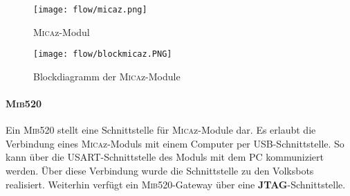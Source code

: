 \begin{figure}[th]
  \centering
    \texttt{[image: flow/micaz.png]}
    \caption{\textsc{Mica}z-Modul \cite{Memsic:2014:Online}}
    \label{fig:micaz}
\end{figure}

\begin{figure}[th]
  \centering
    \texttt{[image: flow/blockmicaz.PNG]}
    \caption{Blockdiagramm der \textsc{Mica}z-Module  \cite{Memsic:2014:Online}}
    \label{fig:blockmicaz}
\end{figure}

\paragraph{\textsc{Mib}520}
Ein \textsc{Mib}520 stellt eine Schnittstelle für \textsc{Mica}z-Module dar. Es erlaubt die Verbindung eines \textsc{Mica}z-Moduls mit einem Computer per USB-Schnittstelle. So kann über die USART-Schnittstelle des Moduls mit dem PC kommuniziert werden. Über diese Verbindung wurde die Schnittstelle zu den Volksbots realisiert. Weiterhin verfügt ein \textsc{Mib}520-Gateway über eine \textbf{JTAG}-Schnittstelle.

